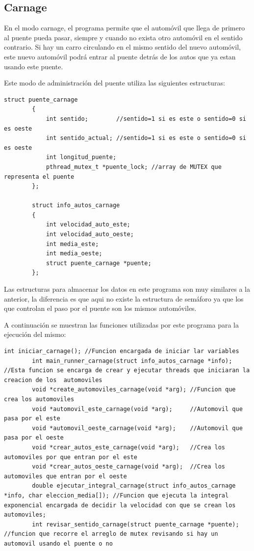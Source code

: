\documentclass[16pt,a4papper]{article}
\begin{document}
	\subsection{Carnage}
	En el modo carnage, el programa permite que el automóvil que llega de primero al puente pueda pasar, siempre y cuando no exista otro automóvil en el sentido contrario. Si hay un carro circulando en el mismo sentido del nuevo automóvil, este nuevo automóvil podrá entrar al puente detrás de los autos que ya estan usando este puente.
	
	Este modo de administración del puente utiliza las siguientes estructuras:
	
	\begin{lstlisting}[style=CStyle]
		struct puente_carnage
		{
			int sentido;        //sentido=1 si es este o sentido=0 si es oeste
			int sentido_actual; //sentido=1 si es este o sentido=0 si es oeste
			int longitud_puente;
			pthread_mutex_t *puente_lock; //array de MUTEX que representa el puente
		};
		
		struct info_autos_carnage
		{
			int velocidad_auto_este;
			int velocidad_auto_oeste;
			int media_este;
			int media_oeste;
			struct puente_carnage *puente;
		};
	\end{lstlisting}

	Las estructuras para almacenar los datos en este programa son muy similares a la anterior, la diferencia es que aqui no existe la estructura de semáforo ya que los que controlan el paso por el puente son los mismos automóviles.\par
	A continuación se muestran las funciones utilizadas por este programa para la ejecución del mismo:
	\begin{lstlisting}[style=CStyle]
		int iniciar_carnage(); //Funcion encargada de iniciar lar variables
		int main_runner_carnage(struct info_autos_carnage *info); //Esta funcion se encarga de crear y ejecutar threads que iniciaran la creacion de los  automoviles
		void *create_automoviles_carnage(void *arg); //Funcion que crea los automoviles
		void *automovil_este_carnage(void *arg);     //Automovil que pasa por el este
		void *automovil_oeste_carnage(void *arg);    //Automovil que pasa por el oeste
		void *crear_autos_este_carnage(void *arg);   //Crea los automoviles por que entran por el este
		void *crear_autos_oeste_carnage(void *arg);  //Crea los automoviles que entran por el oeste
		double ejecutar_integral_carnage(struct info_autos_carnage *info, char eleccion_media[]); //Funcion que ejecuta la integral exponencial encargada de decidir la velocidad con que se crean los automoviles;
		int revisar_sentido_carnage(struct puente_carnage *puente); //funcion que recorre el arreglo de mutex revisando si hay un automovil usando el puente o no
	\end{lstlisting}
\end{document}

